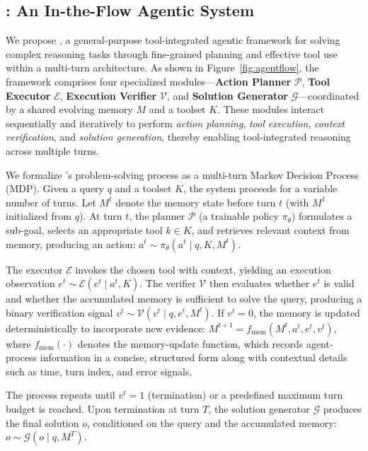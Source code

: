 \vspace{-1mm}
\subsection{\model: An In-the-Flow Agentic System}
\label{subsec:agentflow}


We propose \model, a general-purpose tool-integrated agentic framework for solving complex reasoning tasks through fine-grained planning and effective tool use within a multi-turn architecture. As shown in Figure~\ref{fig:agentflow}, the framework comprises four specialized modules—\textbf{Action Planner} $\mathcal{P}$, \textbf{Tool Executor} $\mathcal{E}$, \textbf{Execution Verifier} $\mathcal{V}$, and \textbf{Solution Generator} $\mathcal{G}$—coordinated by a shared evolving memory $M$ and a toolset $K$. These modules interact sequentially and iteratively to perform \emph{action planning}, \emph{tool execution}, \emph{context verification}, and \emph{solution generation}, thereby enabling tool-integrated reasoning across multiple turns.


We formalize \model's problem-solving process as a multi-turn Markov Decision Process (MDP). Given a query $q$ and a toolset $K$, the system proceeds for a variable number of turns. Let $M^t$ denote the memory state before turn $t$ (with $M^1$ initialized from $q$). At turn $t$, the planner $\mathcal{P}$ (a trainable policy $\pi_\theta$) formulates a sub-goal, selects an appropriate tool $k \in K$, and retrieves relevant context from memory, producing an action: $a^t \sim \pi_\theta(a^t \mid q, K, M^t)$.


The executor $\mathcal{E}$ invokes the chosen tool with context, yielding an execution observation $e^t \sim \mathcal{E}(e^t \mid a^t, K)$.
The verifier $\mathcal{V}$ then evaluates whether $e^t$ is valid and whether the accumulated memory is sufficient to solve the query, producing a binary verification signal $v^t \sim \mathcal{V}(v^t \mid q, e^t, M^t)$.
If $v^t = 0$, the memory is updated deterministically to incorporate new evidence: $M^{t+1} = f_{\text{mem}}\!(M^t, a^t, e^t, v^t)$,
where $f_{\text{mem}}(\cdot)$ denotes the memory-update function, which records agent-process information in a concise, structured form along with contextual details such as time, turn index, and error signals.

The process repeats until $v^t = 1$ (termination) or a predefined maximum turn budget is reached. Upon termination at turn $T$, the solution generator $\mathcal{G}$ produces the final solution $o$, conditioned on the query and the accumulated memory: $o \sim \mathcal{G}(o \mid q, M^T)$.

